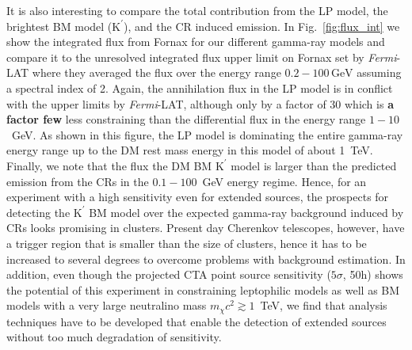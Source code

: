 \documentclass[10pt,aps,pra,reprint,amsmath,amsfonts,amssymb,showpacs,nofootinbib,floatfix]{revtex4-1}
\def\C#1{{\bf #1}}
\newcommand{\Fermi}{{\em Fermi}\xspace}
\newcommand{\rmn}{\mathrm}
\newcommand{\Kp}{\rmn{K}^\prime}
\newcommand{\gev}{\rmn{GeV}}
\begin{document}
It is also interesting to compare the total contribution from the LP
model, the brightest BM model ($\Kp$), and the CR induced emission. In
Fig.~\ref{fig:flux_int} we show the integrated flux from Fornax for
our different gamma-ray models and compare it to the unresolved
integrated flux upper limit on Fornax set by \Fermi-LAT where they
averaged the flux over the energy range $0.2-100\,\gev$ assuming a
spectral index of 2. Again, the annihilation flux in the LP model is
in conflict with the upper limits by \Fermi-LAT, although only by a
factor of 30 which is \C{a factor few} less constraining than the
differential flux in the energy range $1-10$~GeV. As shown in this
figure, the LP model is dominating the entire gamma-ray energy range
up to the DM rest mass energy in this model of about 1~TeV. Finally,
we note that the flux the DM BM $\Kp$ model is larger than the
predicted emission from the CRs in the $0.1-100$~GeV energy
regime. Hence, for an experiment with a high sensitivity even for
extended sources, the prospects for detecting the $\Kp$ BM model over
the expected gamma-ray background induced by CRs looks promising in
clusters. Present day Cherenkov telescopes, however, have a trigger
region that is smaller than the size of clusters, hence it has to be
increased to several degrees to overcome problems with background
estimation. In addition, even though the projected CTA point source
sensitivity ($5\sigma$, 50h) shows the potential of this experiment in
constraining leptophilic models as well as BM models with a very large
neutralino mass $m_\chi c^2 \gtrsim 1$~TeV, we find that analysis
techniques have to be developed that enable the detection of extended
sources without too much degradation of sensitivity.
\end{document}
